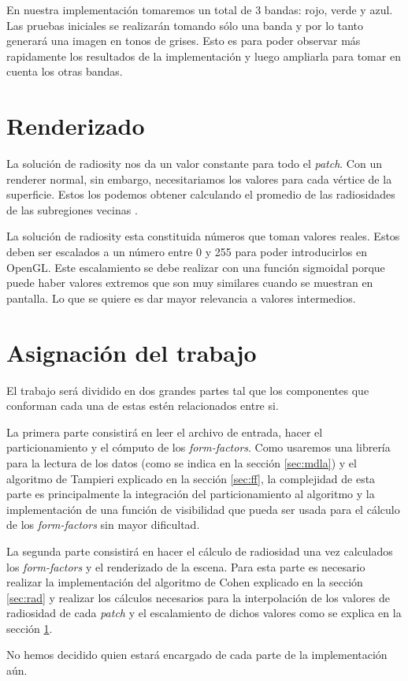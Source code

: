 \documentclass[letterpaper]{article}
\begin{document}
En nuestra implementación tomaremos un total de 3 bandas: rojo, verde
y azul. Las pruebas iniciales se realizarán tomando sólo una banda y
por lo tanto generará una imagen en tonos de grises. Esto es para poder
observar más rapidamente los resultados de la implementación y luego
ampliarla para tomar en cuenta los otras bandas.

\section{Renderizado}
\label{sec:render}
La solución de radiosity nos da un valor constante para todo el
\textsl{patch}. Con un renderer normal, sin embargo, necesitariamos
los valores para cada vértice de la superficie. Estos los podemos
obtener calculando el promedio de las radiosidades de las subregiones
vecinas \cite{Watt92,cohen85}.

La solución de radiosity esta constituida números que toman valores
reales. Estos deben ser escalados a un número entre 0 y 255 para poder
introducirlos en OpenGL. Este escalamiento se debe realizar con una
función sigmoidal \cite{tumblin} porque puede haber valores extremos
que son muy similares cuando se muestran en pantalla. Lo que se quiere
es dar mayor relevancia a valores intermedios.



\section{Asignación del trabajo}
\label{sec:asig}
El trabajo será dividido en dos grandes partes tal que los componentes
que conforman cada una de estas estén relacionados entre si. 

La primera parte consistirá en leer el archivo de entrada, hacer el
particionamiento y el cómputo de los \textsl{form-factors}. Como
usaremos una librería para la lectura de los datos (como se indica en
la sección \ref{sec:mdla}) y el algoritmo de Tampieri explicado en la
sección \ref{sec:ff}, la complejidad de esta parte es principalmente
la integración del particionamiento al algoritmo y la implementación
de una función de visibilidad que pueda ser usada para el cálculo de
los \textsl{form-factors} sin mayor dificultad.

La segunda parte consistirá en hacer el cálculo de radiosidad una vez
calculados los \textsl{form-factors} y el renderizado de la
escena. Para esta parte es necesario realizar la implementación del
algoritmo de Cohen \cite{cohen} explicado en la sección \ref{sec:rad}
y realizar los cálculos necesarios para la interpolación de los
valores de radiosidad de cada \textsl{patch} y el escalamiento de
dichos valores como se explica en la sección \ref{sec:render}.

No hemos decidido quien estará encargado de cada parte de la
implementación aún.



\end{document}
